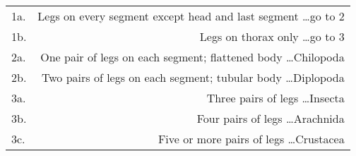 \documentclass[12pt, varwidth, border=5mm]{standalone}
\begin{document}
\begin{tabular}{l@{\hspace{1mm}}r}
1a. & Legs on every segment except head and last segment \dots \dotfill go to 2 \\
1b. & Legs on thorax only \dots \dotfill go to 3 \\ 
2a. & One pair of legs on each segment; flattened body \dots \dotfill Chilopoda \\
2b. & Two pairs of legs on each segment; tubular body \dots \dotfill Diplopoda \\
3a. & Three pairs of legs \dots \dotfill Insecta \\
3b. & Four pairs of legs \dots \dotfill Arachnida \\
3c. & Five or more pairs of legs \dots \dotfill Crustacea \\
\end{tabular}
\end{document}
